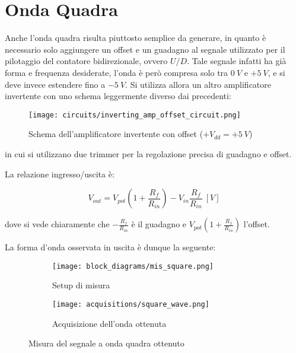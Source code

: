 
\section{Onda Quadra}


Anche l'onda quadra risulta piuttosto semplice da generare, in quanto è necessario solo
aggiungere un offset e un guadagno al segnale utilizzato per il pilotaggio del contatore
bidirezionale, ovvero $U/D$. Tale segnale infatti ha già forma e frequenza desiderate,
l'onda è però compresa solo tra $0\ V$ e $+5\ V$, e si deve invece estendere fino a $-5\ V$.
Si utilizza allora un altro amplificatore invertente con uno schema leggermente diverso dai
precedenti:

\begin{figure}[H]
    \centering
    \texttt{[image: circuits/inverting\_amp\_offset\_circuit.png]}
    \caption{Schema dell'amplificatore invertente con offset ($+V_{dd}=+5\ V$)}
    \label{inverting_amp_offset_circuit}
\end{figure}

in cui si utilizzano due trimmer per la regolazione precisa di guadagno e offset.

La relazione ingresso/uscita è:

\begin{equation}
    V_{out}=V_{pot}\left(1+\frac{R_f}{R_{in}}\right)-V_{in}\frac{R_f}{R_{in}}\ [V]
\end{equation}

dove si vede chiaramente che $-\frac{R_f}{R_{in}}$ è il guadagno e $V_{pot}\left(1+\frac{R_f}{R_{in}}\right)$
l'offset.

La forma d'onda osservata in uscita è dunque la seguente:

\begin{figure}[H]
    \centering

    \begin{subfigure}{.5\textwidth}
        \centering
        \texttt{[image: block\_diagrams/mis\_square.png]}
        \caption{Setup di misura}
        \label{mis_square}
    \end{subfigure}%
    \begin{subfigure}{.5\textwidth}
        \centering
        \texttt{[image: acquisitions/square\_wave.png]}
        \caption{Acquisizione dell'onda ottenuta}
        \label{acq_square}
    \end{subfigure}

    \caption{Misura del segnale a onda quadra ottenuto}
\end{figure}

